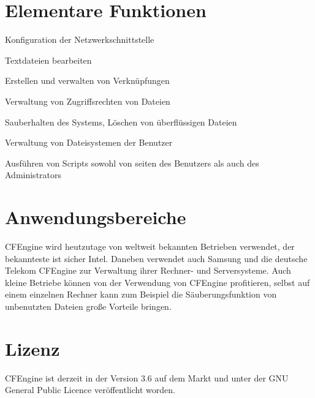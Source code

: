 \documentclass[12pt]{report}
\begin{document}
\section{Elementare Funktionen}
\begin{list}
	\item Konfiguration der Netzwerkschnittstelle
	\item Textdateien bearbeiten
	\item Erstellen und verwalten von Verknüpfungen
	\item Verwaltung von Zugriffsrechten von Dateien
	\item Sauberhalten des Systems, Löschen von überflüssigen Dateien
	\item Verwaltung von Dateisystemen der Benutzer
	\item Ausführen von Scripts sowohl von seiten des Benutzers als auch des Administrators
\end{list}
\section{Anwendungsbereiche}
CFEngine wird heutzutage von weltweit bekannten Betrieben verwendet, der bekannteste ist sicher Intel. Daneben verwendet auch Samsung und die deutsche Telekom CFEngine zur Verwaltung ihrer Rechner- und Serversysteme. Auch kleine Betriebe können von der Verwendung von CFEngine profitieren, selbst auf einem einzelnen Rechner kann zum Beispiel die Säuberungsfunktion von unbenutzten Dateien große Vorteile bringen.
\section{Lizenz}
CFEngine ist derzeit in der Version 3.6 auf dem Markt und unter der GNU General Public Licence veröffentlicht worden.
\end{document}
